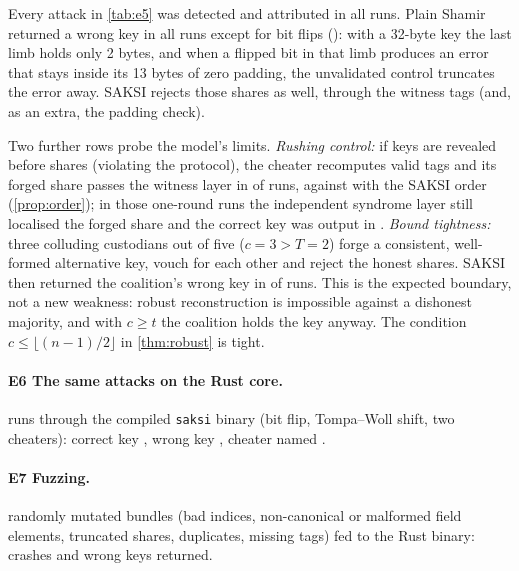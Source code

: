 \documentclass[11pt,a4paper]{article}
\theoremstyle{plain}
\theoremstyle{definition}
\begin{document}
\begin{table}[ht]
\centering\small

\caption{E5: rate at which each attack makes the system output a wrong key, and the rate at which
SAKSI names the cheater. ``Control fooled'' counts runs in which plain Shamir returned a wrong key.}
\label{tab:e5}
\end{table}

Every attack in \cref{tab:e5} was detected and attributed in all runs. Plain Shamir returned a
wrong key in all runs except for bit flips (\EfiveBitflip): with a 32-byte key the last limb holds
only 2 bytes, and when a flipped bit in that limb produces an error that stays inside its 13 bytes
of zero padding, the unvalidated control truncates the error away. SAKSI rejects those shares as
well, through the witness tags (and, as an extra, the padding check).

Two further rows probe the model's limits. \emph{Rushing control:} if keys are revealed before
shares (violating the protocol), the cheater recomputes valid tags and its forged share passes the
witness layer in \RushOneRound{} of \RushTrials{} runs, against \RushTwoRound{} with the SAKSI
order (\cref{prop:order}); in those one-round runs the independent syndrome layer still localised
the forged share and the correct key was output in \RushSyndrome{}. \emph{Bound tightness:} three
colluding custodians out of five ($c=3>T=2$) forge a consistent, well-formed alternative key,
vouch for each other and reject the honest shares. SAKSI then returned the coalition's wrong key in
\BoundWrong{} of \BoundTrials{} runs. This is the expected boundary, not a new weakness: robust
reconstruction is impossible against a dishonest majority, and with $c\ge t$ the coalition holds
the key anyway. The condition $c\le\lfloor(n-1)/2\rfloor$ in \cref{thm:robust} is tight.

\paragraph{E6 The same attacks on the Rust core.} \EsixTrials{} runs through the compiled
\texttt{saksi} binary (bit flip, Tompa--Woll shift, two cheaters): correct key \EsixCorrect{},
wrong key \EsixWrong{}, cheater named \EsixNamed{}.

\paragraph{E7 Fuzzing.} \EsevenN{} randomly mutated bundles (bad indices, non-canonical or
malformed field elements, truncated shares, duplicates, missing tags) fed to the Rust binary:
\EsevenCrash{} crashes and \EsevenWrong{} wrong keys returned.
\end{document}
